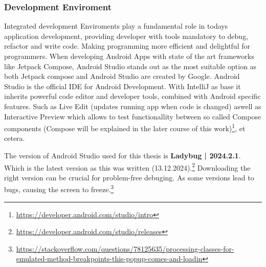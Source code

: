\subsubsection{Development Enviroment}
{\large 
	Integrated development Enviroments play a fundamental role in todays application development, providing developer with tools mandatory to debug, refactor and write code.
	Making programming more efficient and delightful for programmers. When developing Android Apps with state of the art frameworks like Jetpack Compose, Android Studio stands out as the most suitable option as both Jetpack compose and Android Studio are created by Google. Android Studio is the official IDE for Android Development. With IntelliJ as base it inherits powerful code editor and developer tools, combined with Android specific features. Such as Live Edit (updates running app when code is changed) aswell as Interactive Preview which allows to test functionallity between so called Compose components (Compose will be explained in the later course of this work)\footnote{\url{https://developer.android.com/studio/intro}}, et cetera. 
	
	The version of Android Studio used for this thesis is \textbf{Ladybug | 2024.2.1}. Which is the latest version as this was written (13.12.2024).\footnote{\url{https://developer.android.com/studio/releases}}
	Downloading the right version can be crucial for problem-free debuging. As some versions lead to bugs, causing the screen to freeze.\footnote{\url{https://stackoverflow.com/questions/78125635/processing-classes-for-emulated-method-breakpoints-this-popup-comes-and-loadin}}
}
